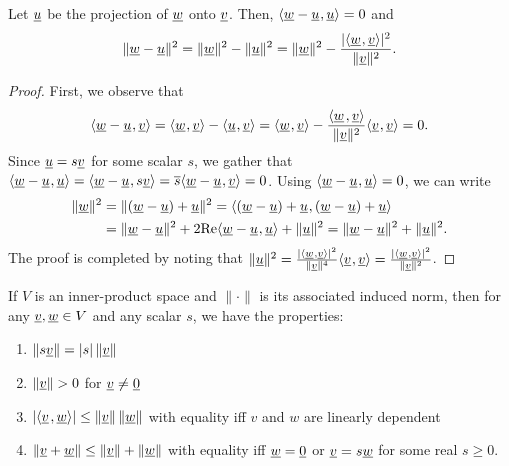 \begin{lemma} \label{lem:proj_loss}
Let $\underline{u}$ be the projection of $\underline{w}$ onto $\underline{v}$.
Then, ${\langle  \underline{w}-\underline{u}  \mskip1mu ,  \underline{u}  \rangle} = 0$ and
\[ \|\underline{w}-\underline{u}\|^2 =  \|\underline{w}\|^2 - \| \underline{u} \|^2 = \|\underline{w}\|^2 - \frac{|{\langle  \underline{w}  \mskip1mu ,  \underline{v}  \rangle}|^2}{\|\underline{v}\|^2}. \]
\end{lemma}
\begin{proof}
First, we observe that
\[ {\langle  \underline{w} - \underline{u}  \mskip1mu ,  \underline{v}  \rangle} = {\langle  \underline{w}  \mskip1mu ,  \underline{v}  \rangle} - {\langle  \underline{u}  \mskip1mu ,  \underline{v}  \rangle} = {\langle  \underline{w}  \mskip1mu ,  \underline{v}  \rangle} - \frac{{\left\langle  \underline{w}  \mskip2mu ,  \underline{v}  \right\rangle}}{\|\underline{v}\|^2} {\langle  \underline{v}  \mskip1mu ,  \underline{v}  \rangle} = 0. \]
Since $\underline{u} = s \underline{v}$ for some scalar $s$, we gather that ${\langle  \underline{w}-\underline{u}  \mskip1mu ,  \underline{u}  \rangle} = {\langle  \underline{w}-\underline{u}  \mskip1mu ,  s \underline{v}  \rangle} = \overline{s} {\langle  \underline{w}-\underline{u}  \mskip1mu ,  \underline{v}  \rangle} = 0$.
Using ${\langle  \underline{w}-\underline{u}  \mskip1mu ,  \underline{u}  \rangle} = 0$, we can write
\begin{align*}
\|\underline{w}\|^2 &= \|(\underline{w}-\underline{u})+\underline{u}\|^2
= {\langle  (\underline{w}-\underline{u})+\underline{u} \mskip1mu , (\underline{w}-\underline{u})+\underline{u} \rangle} \\
&= \|\underline{w}-\underline{u}\|^2 + 2 \mathrm{Re} {\langle  \underline{w}-\underline{u}  \mskip1mu ,  \underline{u}  \rangle} + \|\underline{u}\|^2
= \|\underline{w}-\underline{u}\|^2 + \|\underline{u}\|^2.
\end{align*}
The proof is completed by noting that
$\|\underline{u}\|^2
= \frac{|{\langle  \underline{w}  \mskip1mu ,  \underline{v}  \rangle}|^2}{\|\underline{v}\|^4}
{\langle  \underline{v}  \mskip1mu ,  \underline{v}  \rangle}
= \frac{|{\langle  \underline{w}  \mskip1mu ,  \underline{v}  \rangle}|^2}{\|\underline{v}\|^2}$.
\end{proof}

\begin{theorem}
If $V$ is an inner-product space and $\| \cdot \|$ is its associated induced norm, then for any $\underline{v}, \underline{w} \in V$ and any scalar $s$, we have the properties:
\begin{enumerate}
\item $\left\| s \underline{v} \right\| = |s| \left\| \underline{v} \right\|$
\item $\left\| \underline{v} \right\| > 0$ for $\underline{v} \neq \underline{0}$
\item $\left| {\left\langle  \underline{v}  \mskip2mu ,  \underline{w}  \right\rangle} \right| \leq \left\| \underline{v} \right\| \left\| \underline{w} \right\|$ with equality iff $v$ and $w$ are linearly dependent
\item $\left\| \underline{v} + \underline{w} \right\| \leq \left\| \underline{v} \right\| + \left\| \underline{w} \right\|$ with equality iff $\underline{w}=\underline{0}$ or $\underline{v} = s \underline{w}$ for some real $s\geq 0$.
\end{enumerate}
\end{theorem}

